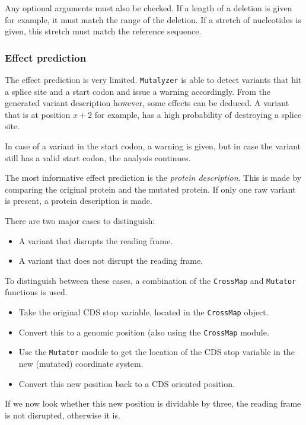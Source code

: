 \documentclass{article}
\begin{document}
Any optional arguments must also be checked. If a length of a deletion is given
for example, it must match the range of the deletion. If a stretch of
nucleotides is given, this stretch must match the reference sequence.

\subsubsection{Effect prediction} \label{subsubsec:effect}
The effect prediction is very limited. \texttt{Mutalyzer} is able to detect
variants that hit a splice site and a start codon and issue a warning
accordingly. From the generated variant description however, some effects can
be deduced. A variant that is at position $x+2$ for example, has a high 
probability of destroying a splice site.

In case of a variant in the start codon, a warning is given, but in case the
variant still has a valid start codon, the analysis continues.

The most informative effect prediction is the \emph{protein description}. This
is made by comparing the original protein and the mutated protein. If only one
raw variant is present, a protein description is made.

There are two major cases to distinguish:
\begin{itemize}
\item A variant that disrupts the reading frame.
\item A variant that does not disrupt the reading frame.
\end{itemize}

To distinguish between these cases, a combination of the \texttt{CrossMap}
and \texttt{Mutator} functions is used. 

\begin{itemize} %
\item Take the original CDS stop variable, located in the \texttt{CrossMap} 
      object.
\item Convert this to a genomic position (also using the \texttt{CrossMap}
      module.
\item Use the \texttt{Mutator} module to get the location of the CDS stop 
      variable in the new (mutated) coordinate system.
\item Convert this new position back to a CDS oriented position.
\end{itemize}

If we now look whether this new position is dividable by three, the reading
frame is not disrupted, otherwise it is.
\end{document}
